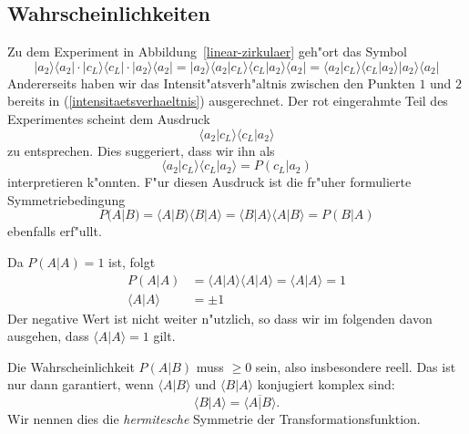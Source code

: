\subsection{Wahrscheinlichkeiten}
Zu dem Experiment in Abbildung~\ref{linear-zirkulaer} geh"ort das Symbol
\[
|a_2\rangle\langle a_2|\cdot
|c_L\rangle\langle c_L|\cdot
|a_2\rangle\langle a_2|
=
|a_2\rangle\langle a_2
|c_L\rangle\langle c_L
|a_2\rangle\langle a_2|
=
\langle a_2
|c_L\rangle\langle c_L
|a_2\rangle
|a_2\rangle
\langle a_2|
\]
Andererseits haben wir das Intensit"atsverh"altnis zwischen den Punkten
$1$ und $2$ bereits in (\ref{intensitaetsverhaeltnis}) ausgerechnet.
Der rot eingerahmte Teil des Experimentes scheint dem Ausdruck
\[
\langle a_2
|c_L\rangle\langle c_L
|a_2\rangle
\]
zu entsprechen.
Dies suggeriert, dass wir ihn als
\[
\langle a_2
|c_L\rangle\langle c_L
|a_2\rangle
=
P(c_L|a_2) 
\]
interpretieren k"onnten. F"ur diesen Ausdruck ist die fr"uher formulierte
Symmetriebedingung 
\[
P(A|B)
=
\langle A |B\rangle
\langle B |A\rangle
=
\langle B |A\rangle
\langle A |B\rangle
=
P(B|A)
\]
ebenfalls erf"ullt.

Da $P(A|A) =1$ ist, folgt
\begin{align*}
P(A|A)&=\langle A|A\rangle \langle A|A\rangle = \langle A|A\rangle = 1
\\
\langle A|A\rangle&=\pm 1
\end{align*}
Der negative Wert ist nicht weiter n"utzlich, so dass wir im folgenden
davon ausgehen, dass $\langle A|A\rangle = 1$ gilt.

Die Wahrscheinlichkeit $P(A|B)$ muss $\ge 0$ sein, also insbesondere
reell. Das ist nur dann garantiert, wenn $\langle A|B\rangle$ und
$\langle B|A\rangle$ konjugiert komplex sind:
\begin{equation}
\langle B|A\rangle
=\overline{\langle A|B\rangle}.
\label{hermiteschesymmetrie}
\end{equation}
Wir nennen dies die {\em hermitesche} Symmetrie der Transformationsfunktion.

